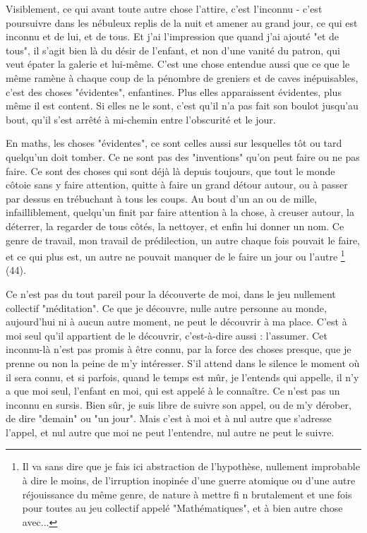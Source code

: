 Visiblement, ce qui avant toute autre chose l'attire, c'est l'inconnu - c'est poursuivre dans les nébuleux replis de la nuit et amener au grand jour, ce qui est inconnu et de lui, et de tous. Et j'ai l'impression que quand j'ai ajouté "et de tous", il s'agit bien là du désir de l'enfant, et non d'une vanité du patron, qui veut épater la galerie et lui-même. C'est une chose entendue aussi que ce que le même ramène à chaque coup de la pénombre de greniers et de caves inépuisables, c'est des choses "évidentes", enfantines. Plus elles apparaissent évidentes, plus même il est content. Si elles ne le sont, c'est qu'il n'a pas fait son boulot jusqu'au bout, qu'il s'est arrêté à mi-chemin entre l'obscurité et le jour.

En maths, les choses "évidentes", ce sont celles aussi sur lesquelles tôt ou tard quelqu'un doit tomber. Ce ne sont pas des "inventions" qu'on peut faire ou ne pas faire. Ce sont des choses qui sont déjà là depuis toujours, que tout le monde côtoie sans y faire attention, quitte à faire un grand détour autour, ou à passer par dessus en trébuchant à tous les coups. Au bout d'un an ou de mille, infailliblement, quelqu'un finit par faire attention à la chose, à creuser autour, la déterrer, la regarder de tous côtés, la nettoyer, et enfin lui donner un nom. Ce genre de travail, mon travail de prédilection, un autre chaque fois pouvait le faire, et ce qui plus est, un autre ne pouvait manquer de le faire un jour ou l’autre \footnote{Il va sans dire que je fais ici abstraction de l’hypothèse, nullement improbable à dire le moins, de l’irruption inopinée d’une guerre atomique ou d'une autre réjouissance du même genre, de nature à mettre fi n brutalement et une fois pour toutes au jeu collectif appelé "Mathématiques", et à bien autre chose avec...} (44).

Ce n'est pas du tout pareil pour la découverte de moi, dans le jeu nullement collectif "méditation". Ce que je découvre, nulle autre personne au monde, aujourd'hui ni à aucun autre moment, ne peut le découvrir à ma place. C'est à moi seul qu'il appartient de le découvrir, c'est-à-dire aussi : l'assumer. Cet inconnu-là n'est pas promis à être connu, par la force des choses presque, que je prenne ou non la peine de m'y intéresser. S'il attend dans le silence le moment où il sera connu, et si parfois, quand le temps est mûr, je l'entends qui appelle, il n'y a que moi seul, l'enfant en moi, qui est appelé à le connaître. Ce n'est pas un inconnu en sursis. Bien sûr, je suis libre de suivre son appel, ou de m'y dérober, de dire "demain" ou "un jour". Mais c'est à moi et à nul autre que s'adresse l'appel, et nul autre que moi ne peut l'entendre, nul autre ne peut le suivre.


